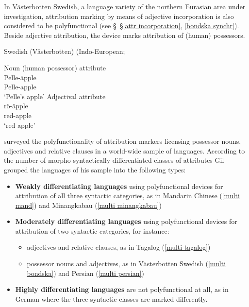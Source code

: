 In Västerbotten Swedish, a language variety of the northern Eurasian area under investigation, attribution marking by means of adjective incorporation is also considered to be polyfunctional (see \S~\S\ref{attr incorporation}, \ref{bondska synchr}). Beside adjective attribution, the device marks attribution of (human) possessors.
\begin{exe}
\ex 
\rm{Swedish (Västerbotten) (Indo-European; \citealt[5]{gil2005}}\\\label{multi bondska}
\begin{xlist}
\ex \rm{Noun (human possessor) attribute}\\
\gll	Pelle-äpple\\
	Pelle-apple\\
\glt	‘Pelle's apple’
\ex \rm{Adjectival attribute}\\
\gll	rö-äpple\\
	red-apple\\
\glt	‘red apple’
\end{xlist}
\end{exe}
\cite{gil2005} surveyed the polyfunctionality of attribution markers licensing possessor nouns, adjectives and relative clauses in a world-wide sample of languages. According to the number of morpho-syntactically differentiated classes of attributes Gil grouped the languages of his sample into the following types:
\begin{itemize}
\item \textbf{Weakly differentiating languages} using polyfunctional devices for attribution of all three syntactic categories, as in Mandarin Chinese (\ref{multi mand}) and Minangkabau (\ref{multi minangkabau})
\item \textbf{Moderately differentiating languages} using polyfunctional devices for attribution of two syntactic categories, for instance:
	\begin{itemize}
	\item adjectives and relative clauses, as in Tagalog (\ref{multi tagalog})
	\item possessor nouns and adjectives, as in Västerbotten Swedish (\ref{multi bondska}) and Persian (\ref{multi persian})
	\end{itemize}
\item \textbf{Highly differentiating languages} are not polyfunctional at all, as in German where the three syntactic classes are marked differently.
\end{itemize}
